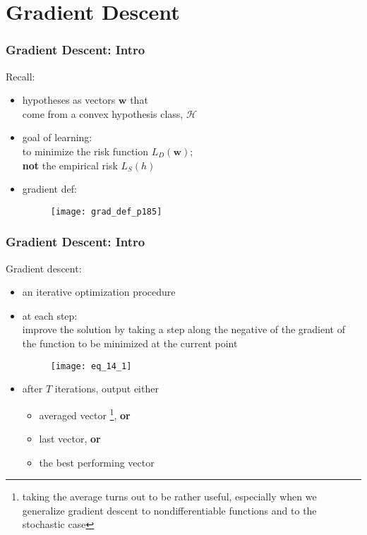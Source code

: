 \section{Gradient Descent}

\begin{frame}
\frametitle{Gradient Descent: Intro}

Recall:\\
\begin{itemize}
    \item hypotheses as vectors $\mathbf{w}$ that \\
         come from a convex hypothesis class, $\mathcal{H}$
    \item goal of learning:\\
          to minimize the risk function $L_D(\mathbf{w})$;\\
          \textbf{not} the empirical risk $L_S (h)$
    \item gradient def:
        \begin{figure}
            \centering
            \texttt{[image: grad\_def\_p185]}
        \end{figure}
\end{itemize}

\end{frame}

\begin{frame}
\frametitle{Gradient Descent: Intro}
Gradient descent:
\begin{itemize}
\item an iterative optimization procedure
\item at each step: \\
    improve the solution by
    taking a step along the negative of the gradient of the function to be minimized at the current point

    \begin{figure}
    \centering
    \texttt{[image: eq\_14\_1]}
    \end{figure}
\item after $T$ iterations, output either
    \begin{itemize}
        \item averaged vector
            \footnote{taking the average turns out to be rather useful, especially
            when we generalize gradient descent to nondifferentiable functions and to the stochastic case}, \textbf{or}
        \item last vector, \textbf{or}
        \item the best performing vector
    \end{itemize}
\end{itemize}

\end{frame}

